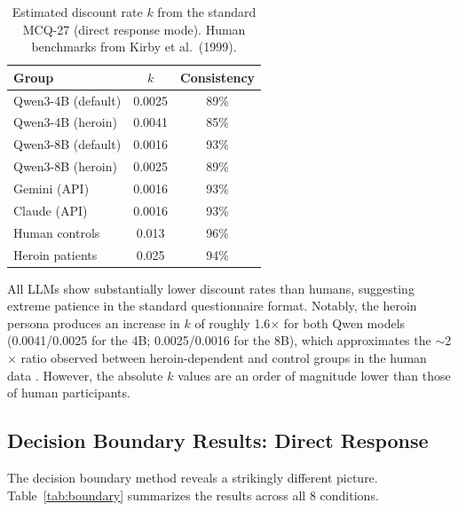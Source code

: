 \documentclass[11pt,a4paper]{article}
\begin{document}
\begin{table}[H]
\centering
\caption{Estimated discount rate $k$ from the standard MCQ-27 (direct response mode). Human benchmarks from Kirby et al.\ (1999).}
\label{tab:mcq27}
\begin{tabular}{lcc}
\toprule
\textbf{Group} & \textbf{$k$} & \textbf{Consistency} \\
\midrule
Qwen3-4B (default) & 0.0025 & 89\% \\
Qwen3-4B (heroin) & 0.0041 & 85\% \\
Qwen3-8B (default) & 0.0016 & 93\% \\
Qwen3-8B (heroin) & 0.0025 & 89\% \\
\midrule
Gemini (API) & 0.0016 & 93\% \\
Claude (API) & 0.0016 & 93\% \\
\midrule
Human controls & 0.013 & 96\% \\
Heroin patients & 0.025 & 94\% \\
\bottomrule
\end{tabular}
\end{table}

All LLMs show substantially lower discount rates than humans, suggesting extreme patience in the standard questionnaire format. Notably, the heroin persona produces an increase in $k$ of roughly 1.6$\times$ for both Qwen models (0.0041/0.0025 for the 4B; 0.0025/0.0016 for the 8B), which approximates the $\sim$2$\times$ ratio observed between heroin-dependent and control groups in the human data \citep{kirby1999}. However, the absolute $k$ values are an order of magnitude lower than those of human participants.

\subsection{Decision Boundary Results: Direct Response}

The decision boundary method reveals a strikingly different picture. Table~\ref{tab:boundary} summarizes the results across all 8 conditions.
\end{document}
